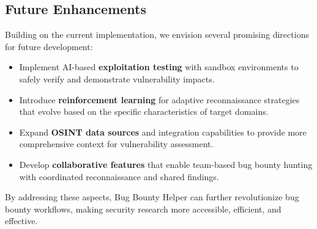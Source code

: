 \documentclass[conference]{IEEEtran}
\begin{document}
\subsection{Future Enhancements}
Building on the current implementation, we envision several promising directions for future development:

\begin{itemize}
    \item Implement AI-based \textbf{exploitation testing} with sandbox environments to safely verify and demonstrate vulnerability impacts.
    
    \item Introduce \textbf{reinforcement learning} for adaptive reconnaissance strategies that evolve based on the specific characteristics of target domains.
    
    \item Expand \textbf{OSINT data sources} and integration capabilities to provide more comprehensive context for vulnerability assessment.
    
    \item Develop \textbf{collaborative features} that enable team-based bug bounty hunting with coordinated reconnaissance and shared findings.
\end{itemize}

By addressing these aspects, Bug Bounty Helper can further revolutionize bug bounty workflows, making security research more accessible, efficient, and effective.
\end{document}
